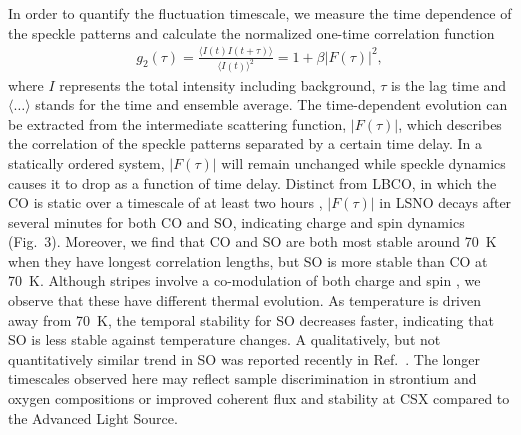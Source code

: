 \documentclass[aps,prl,showpacs,floatfix,twocolumn,superscriptaddress,longbibliography]{revtex4-1}
\begin{document}
In order to quantify the fluctuation timescale, we measure the time dependence of the speckle patterns and calculate the normalized one-time correlation function \cite{Chen2016LBCO}
\begin{align}
g_2 (\tau) = \frac{\langle I(t)I(t+\tau)\rangle}{\langle I(t)\rangle^2} = 1 + \beta|F(\tau)|^2,
\end{align}
where $I$ represents the total intensity including background, $\tau$ is the lag time and $\langle\ldots\rangle$ stands for the time and ensemble average. The time-dependent evolution can be extracted from the intermediate scattering function, $|F(\tau)|$, which describes the correlation of the speckle patterns separated by a certain time delay. In a statically ordered system, $|F(\tau)|$ will remain unchanged while speckle dynamics causes it to drop as a function of time delay. Distinct from \gls{LBCO}, in which the \gls{CO} is static over a timescale of at least two hours \cite{Chen2016LBCO, Thampy2017LBCO}, $|F(\tau)|$ in \gls{LSNO} decays after several minutes for both \gls{CO} and \gls{SO}, indicating charge and spin dynamics (Fig.~3). Moreover, we find that \gls{CO} and \gls{SO} are both most stable around 70~K when they have longest correlation lengths, but \gls{SO} is more stable than \gls{CO} at 70~K. Although stripes involve a co-modulation of both charge and spin \cite{Zachar1998Landau}, we observe that these have different thermal evolution. As temperature is driven away from 70~K, the temporal stability for \gls{SO} decreases faster, indicating that \gls{SO} is less stable against temperature changes. A qualitatively, but not quantitatively similar trend in \gls{SO} was reported recently in Ref.~\cite{Ricci2019LSNO}. The longer timescales observed here may reflect sample discrimination in strontium and oxygen compositions or improved coherent flux and stability at \gls{CSX} compared to the Advanced Light Source.
\end{document}

